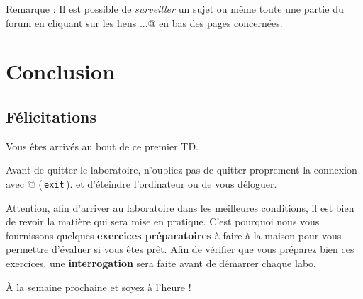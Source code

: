 \documentclass[11pt,a4paper]{article}
\begin{document}
				Remarque :
				Il est possible de
				\textit{surveiller}
				un sujet ou m\^eme toute une partie du forum
				en cliquant sur les liens
				\verb@Surveiller...@
				en bas des pages concern\'ees.
			
            \par
        \section{Conclusion}\subsection{F\'elicitations}
					Vous \^etes arriv\'es au bout de ce premier TD.
        				
            \par
        
					Avant de quitter le laboratoire, n'oubliez pas de 
					quitter proprement la connexion avec @
						(\,\verb|exit|\,).
					et d'\'eteindre l'ordinateur ou de vous d\'eloguer.
					
            \par
        
					Attention, afin d'arriver au laboratoire dans les meilleures conditions, il est 
					bien de revoir la mati\`ere qui sera mise en pratique.
					C'est pourquoi nous vous fournissons quelques \textbf{exercices pr\'eparatoires} \`a faire \`a la maison 
					pour vous permettre d'\'evaluer si vous \^etes pr\^et.
					Afin de v\'erifier que vous pr\'eparez bien ces exercices, une
					\textbf{interrogation}
					sera faite avant de d\'emarrer chaque labo.
				
            \par
        
					\`A la semaine prochaine et soyez \`a l'heure !
				
            \par
        
				
\end{document}
